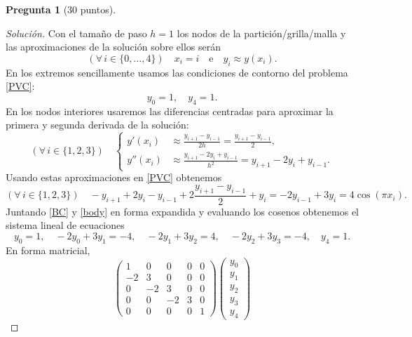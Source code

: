 \documentclass[letterpaper,12pt]{article}
\theoremstyle{definition}
\newtheorem{question}{Pregunta}
\numberwithin{equation}{question}
\newenvironment{solution}{\begin{proof}[Solución]}{\end{proof}}
\begin{document}
\begin{question}[30 puntos]
\begin{solution}
Con el tamaño de paso $h = 1$ los nodos de la partición/grilla/malla y las aproximaciones de la solución sobre ellos serán
%
\begin{equation*}
(\forall\,i\in\{0, \dotsc, 4\}) \quad x_i = i \quad\text{e}\quad y_i \approx y(x_i).
\end{equation*}
%
En los extremos sencillamente usamos las condiciones de contorno del problema \eqref{PVC}:
%
\begin{equation}\label{BC}
y_0 = 1, \quad y_4 = 1.
\end{equation}
%
En los nodos interiores usaremos las diferencias centradas para aproximar la primera y segunda derivada de la solución:
%
\begin{equation*}
(\forall\,i\in\{1, 2, 3\}) \quad \left\{
\begin{aligned}
y'(x_i) & \approx \frac{y_{i+1} - y_{i-1}}{2h} = \frac{y_{i+1} - y_{i-1}}{2},\\
y''(x_i) & \approx \frac{y_{i+1} - 2 y_i + y_{i-1}}{h^2} = y_{i+1} - 2 y_i + y_{i-1}.
\end{aligned}
\right.
\end{equation*}
%
Usando estas aproximaciones en \eqref{PVC} obtenemos
%
\begin{equation}\label{body}
(\forall\,i\in\{1,2,3\}) \quad
-y_{i+1} + 2 y_i - y_{i-1} + 2 \frac{y_{i+1} - y_{i-1}}{2} + y_i
= -2 y_{i-1} + 3 y_i
= 4 \cos(\pi x_i).
\end{equation}
%
Juntando \eqref{BC} y \eqref{body} en forma expandida y evaluando los cosenos obtenemos el sistema lineal de ecuaciones
%
\begin{equation}\label{system}
y_0 = 1, \quad -2 y_0 + 3 y_1 = -4, \quad -2 y_1 + 3 y_2 = 4, \quad -2 y_2 + 3 y_3 =  -4, \quad y_4 = 1.
\end{equation}
%
En forma matricial,
%
\begin{equation}\label{system-5x5}
\begin{pmatrix}
1 & 0 & 0 & 0 & 0\\
-2 & 3 & 0 & 0 & 0\\
0 & -2 & 3 & 0 & 0\\
0 & 0 & -2 & 3 & 0\\
0 & 0 & 0 & 0 & 1
\end{pmatrix}
\begin{pmatrix}
y_0 \\ y_1 \\ y_2 \\ y_3 \\ y_4
\end{pmatrix}

\end{equation}
\end{solution}
\end{question}
\end{document}
